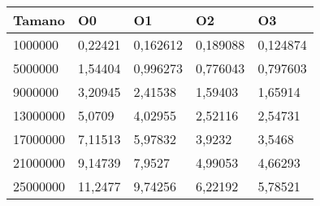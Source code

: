 \begin{tabular}{|l|l|l|l|l|}
	\hline
	Tamano & O0 & O1 & O2 & O3 \\
	\hline
	\hline
	1000000 & 0,22421 & 0,162612 & 0,189088 & 0,124874 \\
	\hline
	5000000 & 1,54404 & 0,996273 & 0,776043 & 0,797603 \\
	\hline
	9000000 & 3,20945 & 2,41538 & 1,59403 & 1,65914 \\
	\hline
	13000000 & 5,0709 & 4,02955 & 2,52116 & 2,54731 \\
	\hline
	17000000 & 7,11513 & 5,97832 & 3,9232 & 3,5468 \\
	\hline
	21000000 & 9,14739 & 7,9527 & 4,99053 & 4,66293 \\
	\hline
	25000000 & 11,2477 & 9,74256 & 6,22192 & 5,78521 \\
	\hline
\end{tabular}
